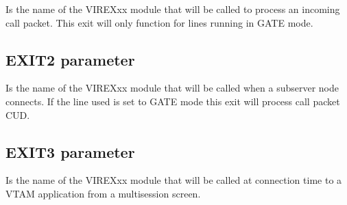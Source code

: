 \documentclass[letterpaper,10pt,english]{sphinxmanual}
\begin{document}
\sphinxAtStartPar
{} \sphinxhyphen{} Is the name of the VIREXxx module that will be called to process an incoming call packet. This exit will only function for lines running in GATE mode.

\ignorespaces 

\subsection{EXIT2 parameter}
\label{\detokenize{Installation_Guide:exit2-parameter}}\label{\detokenize{Installation_Guide:index-56}}
\begin{sphinxVerbatim}[commandchars=\\\{\}]
 
\end{sphinxVerbatim}

\sphinxAtStartPar
{} \sphinxhyphen{} Is the name of the VIREXxx module that will be called when a sub\sphinxhyphen{}server node connects. If the line used is set to GATE mode this exit will process call packet CUD.

\ignorespaces 

\subsection{EXIT3 parameter}
\label{\detokenize{Installation_Guide:exit3-parameter}}\label{\detokenize{Installation_Guide:index-57}}
\begin{sphinxVerbatim}[commandchars=\\\{\}]
 
\end{sphinxVerbatim}

\sphinxAtStartPar
{} \sphinxhyphen{} Is the name of the VIREXxx module that will be called at connection time to a VTAM application from a multi\sphinxhyphen{}session screen.

\ignorespaces 
\end{document}
